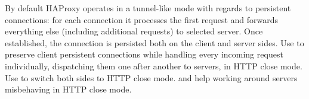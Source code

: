 By default HAProxy operates in a tunnel-like mode with regards to persistent
connections: for each connection it processes the first request and forwards
everything else (including additional requests) to selected server. Once
established, the connection is persisted both on the client and server
sides. Use  to preserve client persistent connections
while handling every incoming request individually, dispatching them one after
another to servers, in HTTP close mode. Use  to switch both
sides to HTTP close mode.  and 
help working around servers misbehaving in HTTP close mode.



